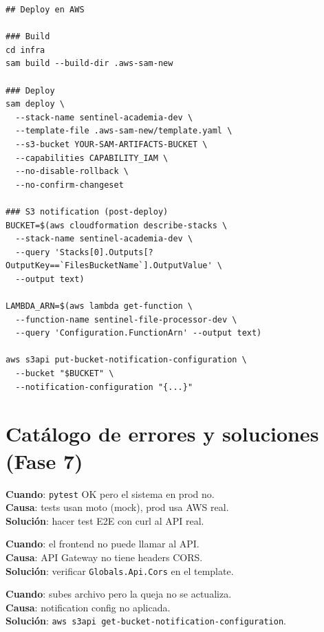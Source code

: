\documentclass[11pt,a4paper,oneside]{article}
\begin{document}
\begin{lstlisting}[caption={README.md — Deploy}]
## Deploy en AWS

### Build
cd infra
sam build --build-dir .aws-sam-new

### Deploy
sam deploy \
  --stack-name sentinel-academia-dev \
  --template-file .aws-sam-new/template.yaml \
  --s3-bucket YOUR-SAM-ARTIFACTS-BUCKET \
  --capabilities CAPABILITY_IAM \
  --no-disable-rollback \
  --no-confirm-changeset

### S3 notification (post-deploy)
BUCKET=$(aws cloudformation describe-stacks \
  --stack-name sentinel-academia-dev \
  --query 'Stacks[0].Outputs[?OutputKey==`FilesBucketName`].OutputValue' \
  --output text)

LAMBDA_ARN=$(aws lambda get-function \
  --function-name sentinel-file-processor-dev \
  --query 'Configuration.FunctionArn' --output text)

aws s3api put-bucket-notification-configuration \
  --bucket "$BUCKET" \
  --notification-configuration "{...}"
\end{lstlisting}

\section{Cat\'alogo de errores y soluciones (Fase 7)}

\begin{tcolorbox}[colback=errred!5!white,colframe=errred,breakable,title={Error 1: Tests pasan pero deploy falla}]
\textbf{Cuando}: \texttt{pytest} OK pero el sistema en prod no. \\
\textbf{Causa}: tests usan moto (mock), prod usa AWS real. \\
\textbf{Soluci\'on}: hacer test E2E con curl al API real.
\end{tcolorbox}

\begin{tcolorbox}[colback=errred!5!white,colframe=errred,breakable,title={Error 2: CORS preflight fails}]
\textbf{Cuando}: el frontend no puede llamar al API. \\
\textbf{Causa}: API Gateway no tiene headers CORS. \\
\textbf{Soluci\'on}: verificar \texttt{Globals.Api.Cors} en el template.
\end{tcolorbox}

\begin{tcolorbox}[colback=errred!5!white,colframe=errred,breakable,title={Error 3: S3 notification no dispara}]
\textbf{Cuando}: subes archivo pero la queja no se actualiza. \\
\textbf{Causa}: notification config no aplicada. \\
\textbf{Soluci\'on}: \texttt{aws s3api get-bucket-notification-configuration}.
\end{tcolorbox}
\end{document}
